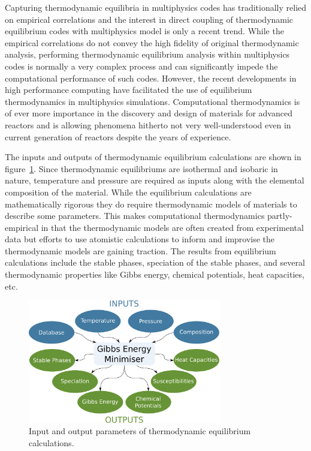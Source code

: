 	Capturing thermodynamic equilibria in multiphysics codes has traditionally relied on empirical correlations and the interest in direct coupling of thermodynamic equilibrium codes with multiphysics model is only a recent trend. While the empirical correlations do not convey the high fidelity of original thermodynamic analysis, performing thermodynamic equilibrium analysis within multiphysics codes is normally a very complex process and can significantly impede the computational performance of such codes. However, the recent developments in high performance computing have facilitated the use of equilibrium thermodynamics in multiphysics  simulations. Computational thermodynamics is of ever more importance in the discovery and design of materials for advanced reactors and is allowing phenomena hitherto not very well-understood even in current generation of reactors despite the years of experience.
	
	
	The inputs  and outputs of thermodynamic equilibrium calculations are shown in figure~\ref{fig:Thermod}. Since thermodynamic equilibriums are isothermal and isobaric in nature, temperature and pressure are required as inputs along with the elemental composition of the material. While the equilibrium calculations are mathematically rigorous they do require thermodynamic models of materials to describe some parameters. This makes computational thermodynamics partly-empirical in that the thermodynamic models are often created from experimental data but efforts to use atomistic calculations to inform and improvise the thermodynamic models are gaining traction. The results from equilibrium calculations include the stable phases, speciation of the stable phases, and several thermodynamic properties like Gibbs energy, chemical potentials, heat capacities, etc.
	\begin{figure}[ht]
        		\centering
        		\includegraphics[width=0.75\textwidth]{figures/chapter-1/thermodynamics.pdf}
        		\caption{Input and output parameters of thermodynamic equilibrium calculations.}
        		\label{fig:Thermod}
    	\end{figure}
	
